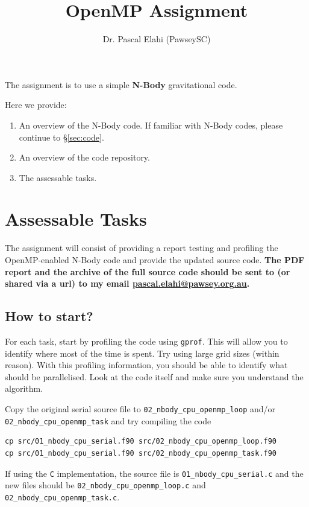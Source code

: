 \documentclass[11pt]{amsart}
\title[OpenMP]{OpenMP Assignment}
\author[]{Dr. Pascal Elahi (PawseySC)}
\begin{document}
\maketitle
\pagestyle{plain}
The assignment is to use a simple \textbf{N-Body} gravitational code. 

Here we provide:
\begin{enumerate}
	\item[\S\ref{sec:nbody}:] An overview of the N-Body code. If familiar with N-Body codes, please continue to \S\ref{sec:code}.
	\item[\S\ref{sec:code}:] An overview of the code repository. 
  \item[\S\ref{sec:tasks}:] The assessable tasks.  
\end{enumerate}



\newpage
\section{Assessable Tasks}\label{sec:tasks}
\begin{center}
  \large
  The assignment will consist of providing a report testing and profiling the OpenMP-enabled N-Body code and provide the updated source code. 
  \textbf{The PDF report and the archive of the full source code should be sent to (or shared via a url) to my email \href{mailto:pascal.elahi@pawsey.org.au}{pascal.elahi@pawsey.org.au}. }
\end{center}
\subsection*{How to start?\nopunct\\} \label{sec:tasks:staring}
For each task, start by profiling the code using \texttt{gprof}. This will allow you to identify where most of the time is spent. Try using large grid sizes (within reason). With this profiling information, you should be able to identify what should be parallelised. Look at the code itself and make sure you understand the algorithm.

Copy the original serial source file to \texttt{02\_nbody\_cpu\_openmp\_loop} and/or \texttt{02\_nbody\_cpu\_openmp\_task} and try compiling the code
\begin{center}
\begin{minipage}{0.95\textwidth}
\begin{verbatim}
cp src/01_nbody_cpu_serial.f90 src/02_nbody_cpu_openmp_loop.f90
cp src/01_nbody_cpu_serial.f90 src/02_nbody_cpu_openmp_task.f90
\end{verbatim}
\end{minipage}
\end{center}
If using the \texttt{C} implementation, the source file is \texttt{01\_nbody\_cpu\_serial.c} and the new files should be \texttt{02\_nbody\_cpu\_openmp\_loop.c} and \texttt{02\_nbody\_cpu\_openmp\_task.c}.
\end{document}
